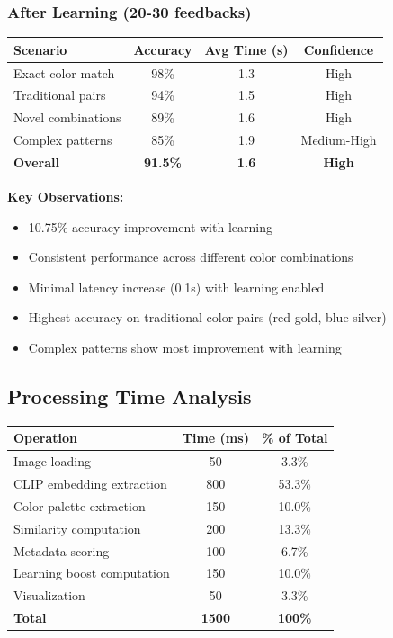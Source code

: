 \documentclass[12pt,a4paper]{report}
\begin{document}
\subsubsection{After Learning (20-30 feedbacks)}

\begin{center}
\begin{tabular}{|l|c|c|c|}
\hline
\textbf{Scenario} & \textbf{Accuracy} & \textbf{Avg Time (s)} & \textbf{Confidence} \\
\hline
Exact color match & 98\% & 1.3 & High \\
Traditional pairs & 94\% & 1.5 & High \\
Novel combinations & 89\% & 1.6 & High \\
Complex patterns & 85\% & 1.9 & Medium-High \\
\textbf{Overall} & \textbf{91.5\%} & \textbf{1.6} & \textbf{High} \\
\hline
\end{tabular}
\end{center}

\textbf{Key Observations:}
\begin{itemize}
    \item 10.75\% accuracy improvement with learning
    \item Consistent performance across different color combinations
    \item Minimal latency increase (0.1s) with learning enabled
    \item Highest accuracy on traditional color pairs (red-gold, blue-silver)
    \item Complex patterns show most improvement with learning
\end{itemize}

\subsection{Processing Time Analysis}

\begin{center}
\begin{tabular}{|l|c|c|}
\hline
\textbf{Operation} & \textbf{Time (ms)} & \textbf{\% of Total} \\
\hline
Image loading & 50 & 3.3\% \\
CLIP embedding extraction & 800 & 53.3\% \\
Color palette extraction & 150 & 10.0\% \\
Similarity computation & 200 & 13.3\% \\
Metadata scoring & 100 & 6.7\% \\
Learning boost computation & 150 & 10.0\% \\
Visualization & 50 & 3.3\% \\
\textbf{Total} & \textbf{1500} & \textbf{100\%} \\
\hline
\end{tabular}
\end{center}
\end{document}
